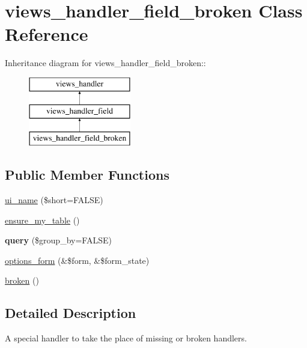 \hypertarget{classviews__handler__field__broken}{
\section{views\_\-handler\_\-field\_\-broken Class Reference}
\label{classviews__handler__field__broken}
}
Inheritance diagram for views\_\-handler\_\-field\_\-broken::\begin{figure}[H]
\begin{center}
\leavevmode
\includegraphics[height=3cm]{classviews__handler__field__broken}
\end{center}
\end{figure}
\subsection*{Public Member Functions}
\begin{DoxyCompactItemize}
\item 
\hyperlink{classviews__handler__field__broken_a0b3272926656e5fc3f6c011fa51746ed}{ui\_\-name} (\$short=FALSE)
\item 
\hyperlink{classviews__handler__field__broken_a887902026800149644e827fbb92dba15}{ensure\_\-my\_\-table} ()
\item 
\hypertarget{classviews__handler__field__broken_aff6f74790ab621b98a8622d381b538d4}{
{\bfseries query} (\$group\_\-by=FALSE)}
\label{classviews__handler__field__broken_aff6f74790ab621b98a8622d381b538d4}

\item 
\hyperlink{classviews__handler__field__broken_afc66860f4fb5a1878a131c30500e6e1d}{options\_\-form} (\&\$form, \&\$form\_\-state)
\item 
\hyperlink{classviews__handler__field__broken_af579634a7ec51fa709d7c0cddc135725}{broken} ()
\end{DoxyCompactItemize}


\subsection{Detailed Description}
A special handler to take the place of missing or broken handlers. 

